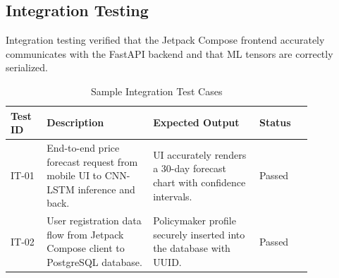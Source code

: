 \subsection{Integration Testing}
Integration testing verified that the Jetpack Compose frontend accurately communicates with the FastAPI backend and that ML tensors are correctly serialized.
\begin{table}[htbp]
  \centering
  \caption{Sample Integration Test Cases}
  \begin{tabular}{|p{0.1\linewidth}|p{0.3\linewidth}|p{0.3\linewidth}|p{0.15\linewidth}|}
    \hline
    \textbf{Test ID} & \textbf{Description} & \textbf{Expected Output} & \textbf{Status} \\
    \hline
    IT-01 & End-to-end price forecast request from mobile UI to CNN-LSTM inference and back. & UI accurately renders a 30-day forecast chart with confidence intervals. & Passed \\
    \hline
    IT-02 & User registration data flow from Jetpack Compose client to PostgreSQL database. & Policymaker profile securely inserted into the database with UUID. & Passed \\
    \hline
  \end{tabular}
\end{table}


